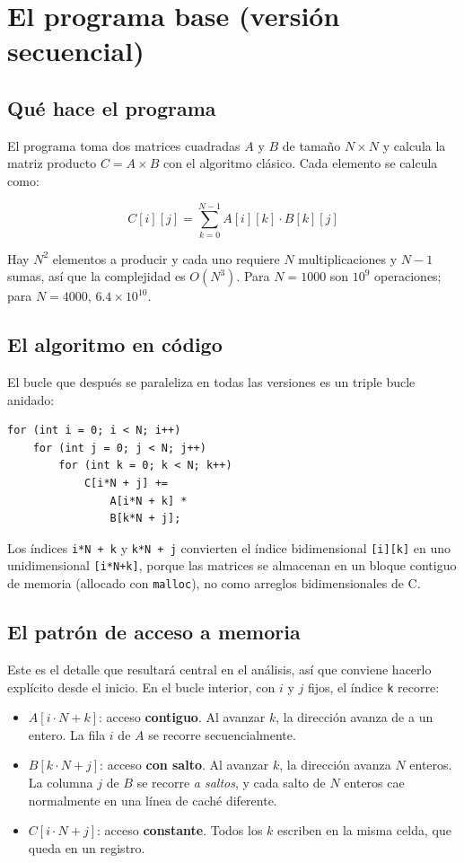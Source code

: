 \section{El programa base (versión secuencial)}

\subsection{Qué hace el programa}

El programa toma dos matrices cuadradas $A$ y $B$ de tamaño $N \times N$ y calcula la matriz producto $C = A \times B$ con el algoritmo clásico. Cada elemento se calcula como:

\[
C[i][j] = \sum_{k=0}^{N-1} A[i][k] \cdot B[k][j]
\]

Hay $N^2$ elementos a producir y cada uno requiere $N$ multiplicaciones y $N-1$ sumas, así que la complejidad es $O(N^3)$. Para $N = 1000$ son $10^9$ operaciones; para $N = 4000$, $6.4 \times 10^{10}$.

\subsection{El algoritmo en código}

El bucle que después se paraleliza en todas las versiones es un triple bucle anidado:

\begin{verbatim}
for (int i = 0; i < N; i++)
    for (int j = 0; j < N; j++)
        for (int k = 0; k < N; k++)
            C[i*N + j] +=
                A[i*N + k] *
                B[k*N + j];
\end{verbatim}

Los índices \texttt{i*N + k} y \texttt{k*N + j} convierten el índice bidimensional \texttt{[i][k]} en uno unidimensional \texttt{[i*N+k]}, porque las matrices se almacenan en un bloque contiguo de memoria (allocado con \texttt{malloc}), no como arreglos bidimensionales de C.

\subsection{El patrón de acceso a memoria}

Este es el detalle que resultará central en el análisis, así que conviene hacerlo explícito desde el inicio. En el bucle interior, con $i$ y $j$ fijos, el índice \texttt{k} recorre:

\begin{itemize}
    \item $A[i \cdot N + k]$: acceso \textbf{contiguo}. Al avanzar $k$, la dirección avanza de a un entero. La fila $i$ de $A$ se recorre secuencialmente.
    \item $B[k \cdot N + j]$: acceso \textbf{con salto}. Al avanzar $k$, la dirección avanza $N$ enteros. La columna $j$ de $B$ se recorre \emph{a saltos}, y cada salto de $N$ enteros cae normalmente en una línea de caché diferente.
    \item $C[i \cdot N + j]$: acceso \textbf{constante}. Todos los $k$ escriben en la misma celda, que queda en un registro.
\end{itemize}

